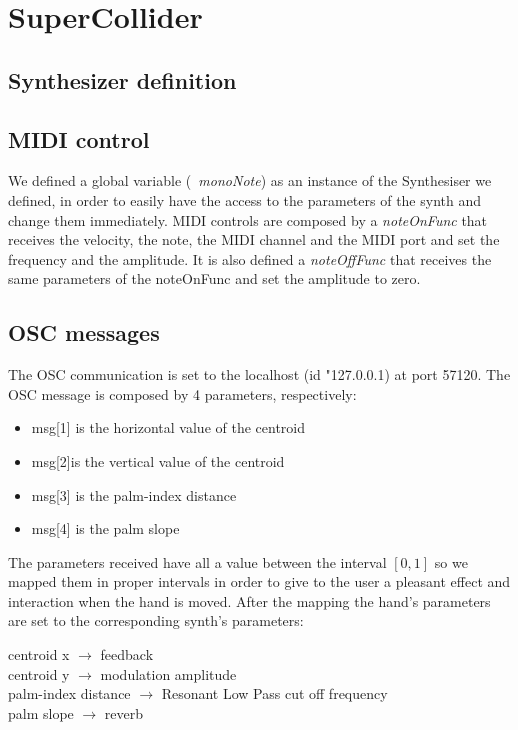 \documentclass[a4paper,12pt]{report}
\begin{document}
\section*{SuperCollider}

\subsection*{Synthesizer definition}

\subsection*{MIDI control} 
We defined a global variable (\emph{~monoNote}) as an instance of the Synthesiser we defined, in order to easily have the access to the parameters of the synth and change them immediately.
MIDI controls are composed by a \emph{noteOnFunc} that receives the velocity, the note, the MIDI channel and the MIDI port and set the frequency and the amplitude. It is also defined a \emph{noteOffFunc} that receives the same parameters of the noteOnFunc and set the amplitude to zero.

\subsection*{OSC messages}
The OSC communication is set to the localhost (id "127.0.0.1) at port 57120. The OSC message is composed by 4 parameters, respectively: 
\begin{itemize}
	\item msg[1] is the horizontal value of the centroid
	\item msg[2]is the vertical value of the centroid
	\item msg[3] is the palm-index distance
	\item msg[4] is the palm slope
\end{itemize}
The parameters received have all a value between the interval $[0,1]$ so we mapped them in proper intervals in order to give to the user a pleasant effect and interaction when the hand is moved. After the mapping the hand's parameters are set to the corresponding synth's parameters:
\begin{center}
centroid x $\rightarrow$ feedback\\
centroid y $\rightarrow$ modulation amplitude\\
palm-index distance $\rightarrow$ Resonant Low Pass cut off frequency\\
palm slope $\rightarrow$ reverb\\
\end{center}
\end{document}
